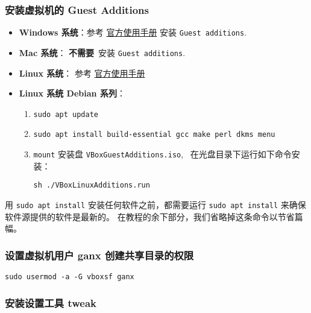 \documentclass[
    11pt,
    cite=authoryear,
    device=normal,
    lang=cn,
    mode=simple,
    result=answer,
    toc=onecol,
]{elegantbook_sierxue}
\begin{document}
\subsubsection{安装虚拟机的 Guest Additions}%
\label{ssub:vbox-guest-additions}
\begin{itemize}
    \item \textbf{Windows 系统}：参考
        \href{https://www.virtualbox.org/manual/UserManual.html#additions-windows}{官方使用手册}
        安装 \lstinline{Guest additions}.
    \item \textbf{Mac 系统}： \textbf{不需要}~安装
        \lstinline{Guest additions}.
    \item \textbf{Linux 系统}： 参考
        \href{https://www.virtualbox.org/manual/UserManual.html#additions-linux}{官方使用手册}
    \item \textbf{Linux 系统 Debian 系列}：
        \begin{enumerate}
            \item \lstinline{sudo apt update}
            \item \lstinline{sudo apt install build-essential gcc make perl dkms menu}
            \item \lstinline{mount} 安装盘
                \lstinline{VBoxGuestAdditions.iso},~
                在光盘目录下运行如下命令安装：
                 \begin{center}\label{center:vm-guest-additions}
                     \lstinline{sh ./VBoxLinuxAdditions.run}
                 \end{center}
        \end{enumerate}
\end{itemize}
\begin{note}\label{note:ubuntu-update}
    用 \lstinline{sudo apt install} 安装任何软件之前，都需要运行
    \lstinline{sudo apt install} 来确保软件源提供的软件是最新的。
    在教程的余下部分，我们省略掉这条命令以节省篇幅。
\end{note}

\subsubsection{设置虚拟机用户 ganx 创建共享目录的权限}%
\label{ssub:vbox-ganx-vboxsf}
\lstinline{sudo usermod -a -G vboxsf ganx}

\subsubsection{安装设置工具 tweak}%
\label{ssub:vm-treak}
\end{document}
